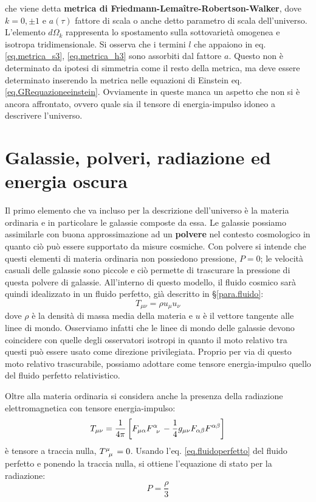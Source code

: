 che viene detta \textbf{metrica di Friedmann-Lema\^itre-Robertson-Walker}, dove $k=0,\pm 1$ e $a(\tau)$ fattore di scala o anche detto parametro di scala dell'universo. L'elemento $d\Omega_k$ rappresenta lo spostamento sulla sottovarietà omogenea e isotropa tridimensionale. Si osserva che i termini $l$ che appaiono in eq. \ref{eq.metrica_s3}, \ref{eq.metrica_h3} sono assorbiti dal fattore $a$.
Questo non è determinato da ipotesi di simmetria come il resto della metrica, ma deve essere determinato inserendo la metrica nelle equazioni di Einstein eq. \ref{eq.GRequazioneeinstein}. Ovviamente in queste manca un aspetto che non si è ancora affrontato, ovvero quale sia il tensore di energia-impulso idoneo a descrivere l'universo.

\section{Galassie, polveri, radiazione ed energia oscura}\label{para.polveri}
Il primo elemento che va incluso per la descrizione dell'universo è la materia ordinaria e in particolare le galassie composte da essa. Le galassie possiamo assimilarle con buona approssimazione ad un \textbf{polvere} nel contesto cosmologico in quanto ciò può essere supportato da misure cosmiche. Con polvere si intende che questi elementi di materia ordinaria non possiedono pressione, $P=0$; le velocità casuali delle galassie sono piccole e ciò permette di trascurare la pressione di questa polvere di galassie.
All'interno di questo modello, il fluido cosmico sarà quindi idealizzato in un fluido perfetto, già descritto in \S\ref{para.fluido}:
\begin{equation*}
    T_{\mu\nu} = \rho u_\mu u_\nu
\end{equation*}
dove $\rho$ è la densità di massa media della materia e $u$ è il vettore tangente alle linee di mondo. Osserviamo infatti che le linee di mondo delle galassie devono coincidere con quelle degli osservatori isotropi in quanto il moto relativo tra questi può essere usato come direzione privilegiata. Proprio per via di questo moto relativo trascurabile, possiamo adottare come tensore energia-impulso quello del fluido perfetto relativistico.

Oltre alla materia ordinaria si considera anche la presenza della radiazione elettromagnetica con tensore energia-impulso:
\begin{equation*}
    T_{\mu\nu} = \frac{1}{4\pi} \left[ F_{\mu\alpha}\tensor{F}{^\alpha_\nu} - \frac{1}{4}g_{\mu\nu}F_{\alpha\beta}F^{\alpha\beta} \right]
\end{equation*}
è tensore a traccia nulla, $\tensor{T}{^\mu_\mu}=0$. Usando l'eq. \ref{eq.fluidoperfetto} del fluido perfetto e ponendo la traccia nulla, si ottiene l'equazione di stato per la radiazione:
\begin{equation*}
    P = \frac{\rho}{3}
\end{equation*}

